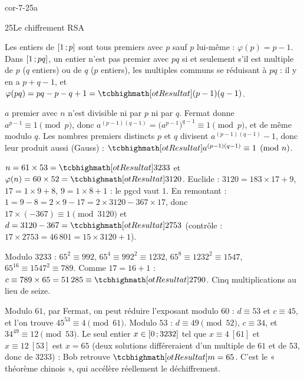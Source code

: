 
\begin{blocLivre}{cor-7-25a}
\begin{corrige}{25}{Le chiffrement RSA}
\begin{questions}
  \item Les entiers de $\mathopen{[}1\,{;}\,p\mathclose{]}$ sont tous premiers avec $p$ sauf $p$
    lui-même : $\varphi(p)=p-1$. Dans $\mathopen{[}1\,{;}\,pq\mathclose{]}$, un entier n'est
    pas premier avec $pq$ si et seulement s'il est multiple de $p$ ($q$
    entiers) ou de $q$ ($p$ entiers), les multiples communs se réduisant à
    $pq$ : il y en a $p+q-1$, et
    $\varphi(pq)=pq-p-q+1=\res{(p-1)(q-1)}$.
  \item $a$ premier avec $n$ n'est divisible ni par $p$ ni par $q$. Fermat
    donne $a^{p-1}\equiv1\pmod p$, donc
    $a^{(p-1)(q-1)}=\bigl(a^{p-1}\bigr)^{q-1}\equiv1\pmod p$, et de même
    modulo $q$. Les nombres premiers distincts $p$ et $q$ divisent
    $a^{(p-1)(q-1)}-1$, donc leur produit aussi (Gauss) :
    $\res{a^{(p-1)(q-1)}\equiv1\pmod n}$.
\end{questions}
\begin{questions}[resume]
  \item $n=61\times53=\res{3233}$ et $\varphi(n)=60\times52=\res{3120}$.
    Euclide : $3120=183\times17+9$, $17=1\times9+8$, $9=1\times8+1$ : le
    pgcd vaut $1$. En remontant :
    $1=9-8=2\times9-17=2\times3120-367\times17$, donc
    $17\times(-367)\equiv1\pmod{3120}$ et
    $d=3120-367=\res{2753}$ (contrôle : $17\times2753=46\,801=15\times3120+1$).
  \item Modulo $3233$ : $65^{2}\equiv992$, $65^{4}\equiv992^{2}\equiv1232$,
    $65^{8}\equiv1232^{2}\equiv1547$, $65^{16}\equiv1547^{2}\equiv789$. Comme
    $17=16+1$ : $c\equiv789\times65=51\,285\equiv\res{2790}$. Cinq
    multiplications au lieu de seize.
  \item Modulo $61$, par Fermat, on peut réduire l'exposant modulo $60$ :
    $d\equiv53$ et $c\equiv45$, et l'on trouve $45^{53}\equiv4\pmod{61}$.
    Modulo $53$ : $d\equiv49\pmod{52}$, $c\equiv34$, et
    $34^{49}\equiv12\pmod{53}$. Le seul entier $x\in\mathopen{[}0\,{;}\,3232\mathclose{]}$ tel
    que $x\equiv4\ [61]$ et $x\equiv12\ [53]$ est $x=65$ (deux solutions
    différeraient d'un multiple de $61$ et de $53$, donc de $3233$) : Bob
    retrouve $\res{m=65}$. C'est le « théorème chinois », qui accélère
    réellement le déchiffrement.
\end{questions}
\end{corrige}
\end{blocLivre}

